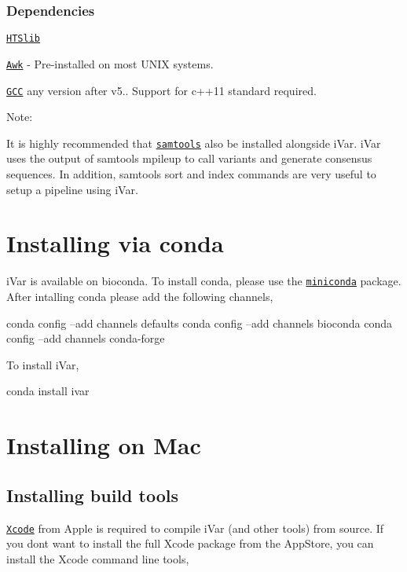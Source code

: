 \subsubsection*{Dependencies}


\begin{DoxyItemize}
\item \href{http://www.htslib.org/download/}{\tt H\+T\+Slib}
\item \href{https://www.cs.princeton.edu/~bwk/btl.mirror/}{\tt Awk} -\/ Pre-\/installed on most U\+N\+IX systems.
\item \href{https://gcc.gnu.org/}{\tt G\+CC} any version after v5.. Support for c++11 standard required.
\end{DoxyItemize}

Note\+:
\begin{DoxyItemize}
\item It is highly recommended that \href{https://github.com/samtools/samtools}{\tt samtools} also be installed alongside i\+Var. i\+Var uses the output of samtools mpileup to call variants and generate consensus sequences. In addition, samtools {\ttfamily sort} and {\ttfamily index} commands are very useful to setup a pipeline using i\+Var.
\end{DoxyItemize}\hypertarget{installpage_autotoc_md0}{}\section{Installing via conda}\label{installpage_autotoc_md0}
i\+Var is available on bioconda. To install conda, please use the \href{https://conda.io/miniconda.html}{\tt miniconda} package. After intalling conda please add the following channels,


\begin{DoxyCode}
conda config --add channels defaults
conda config --add channels bioconda
conda config --add channels conda-forge
\end{DoxyCode}


To install i\+Var,


\begin{DoxyCode}
conda install ivar
\end{DoxyCode}
\hypertarget{installpage_autotoc_md1}{}\section{Installing on Mac}\label{installpage_autotoc_md1}
\hypertarget{installpage_autotoc_md2}{}\subsection{Installing build tools}\label{installpage_autotoc_md2}
\href{https://developer.apple.com/xcode/}{\tt Xcode} from Apple is required to compile i\+Var (and other tools) from source. If you don\textquotesingle{}t want to install the full Xcode package from the App\+Store, you can install the Xcode command line tools,


